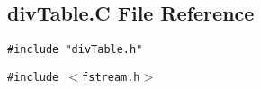 \subsection{div\-Table.C File Reference}
\label{divTable.C}
{\tt \#include "div\-Table.h"}\par
{\tt \#include $<$fstream.h$>$}\par
